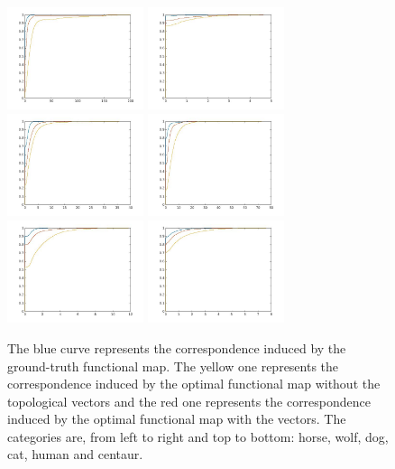 \begin{figure}[t!] 
\begin{center}
\includegraphics[height = 3cm]{figures/horse910_200.jpg}
\includegraphics[height = 3cm]{figures/wolf2_200.jpg}
\includegraphics[height = 3cm]{figures/dog1105_200.jpg}
\includegraphics[height = 3cm]{figures/cat5_100.jpg}
\includegraphics[height = 3cm]{figures/human1407_200.jpg}  
\includegraphics[height = 3cm]{figures/centaur704_200.jpg} 
\caption[Improvements measured with functional maps]{\label{fig:improvements} The blue curve represents the correspondence induced by the ground-truth functional map. The yellow one
		represents the correspondence induced by the optimal functional map without the topological vectors and the red one 
		represents the correspondence induced by the optimal functional map with the vectors. 
		The categories are, from left to right and top to bottom: horse, wolf, dog, cat, human and centaur.}
\end{center}
\end{figure}



